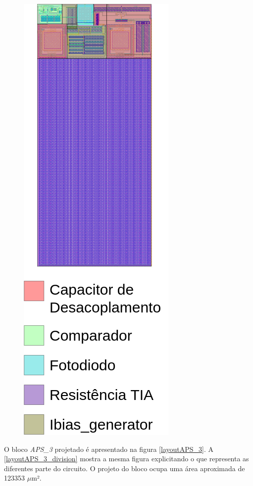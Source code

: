 \begin{figure}[!h]
\begin{minipage}{0.4\textwidth}
    \includegraphics[scale=0.4]{Resultados/Imagens/Image_TIA.png}
    \label{layoutTIA_division}
    \end{minipage}
\end{figure}

O bloco \textit{APS\_3} projetado é apresentado na figura \autoref{layoutAPS_3}. A \autoref{layoutAPS_3_division} mostra a mesma figura explicitando o que representa as diferentes parte do circuito. O projeto do bloco ocupa uma área aproximada de 123353 $\mu$m².

